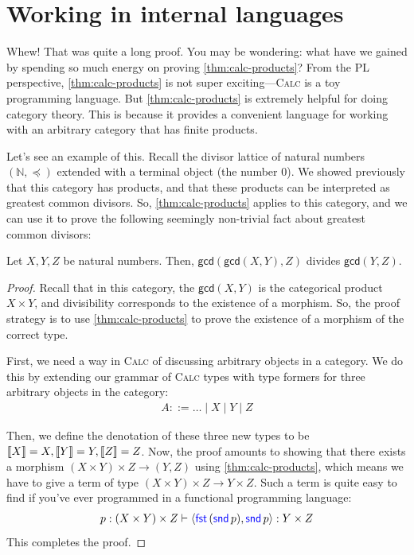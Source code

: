 \section{Working in internal languages}

Whew! That was quite a long proof.
You may be wondering: what have we gained by spending so much energy on proving
\cref{thm:calc-products}?
From the PL perspective, \cref{thm:calc-products} is not super exciting---\textsc{Calc}
is a toy programming language.
But \cref{thm:calc-products} is extremely helpful for doing category theory.
This is because it provides a convenient language for working with an arbitrary
category that has finite products. 

Let's see an example of this. Recall the divisor lattice of natural numbers
$(\mathbb{N}, \preceq)$ extended with a terminal object (the number $0$). We
showed previously that this category has products, and that these products 
can be interpreted as greatest common divisors. So, \cref{thm:calc-products} applies 
to this category, 
and we can use it to prove the following seemingly non-trivial fact about greatest common divisors:
\begin{proposition}
  Let $X, Y, Z$ be natural numbers. Then, $\mathsf{gcd}(\mathsf{gcd}(X, Y), Z)$
  divides $\mathsf{gcd}(Y, Z)$.
\end{proposition}
\begin{proof}
  Recall that in this category, the $\mathsf{gcd}(X, Y)$ is the categorical product $X \times Y$,
  and divisibility corresponds to the existence of a morphism.
  So, the proof strategy is to use \cref{thm:calc-products} to prove the existence of a morphism 
  of the correct type.

  First, we need a way in \textsc{Calc} of discussing arbitrary objects in a category. 
  We do this by extending our grammar of \textsc{Calc} types with type formers for three 
  arbitrary objects in the category:
  \begin{align*}
    A ::= \dots \mid X \mid Y \mid Z
  \end{align*}

  Then, we define the denotation of these three new types to be $\left\llbracket X \right\rrbracket = X, \left\llbracket Y \right\rrbracket = Y, 
  \left\llbracket Z \right\rrbracket = Z$.
  Now, the proof amounts to showing that there 
  exists a morphism $(X \times Y) \times Z \to (Y, Z)$ using \cref{thm:calc-products}, 
  which means we have to give a term of type $(X \times Y) \times Z \to Y \times Z$.
  Such a term is quite easy to find if you've ever programmed in a functional 
  programming language:
  \begin{align*}
    p : (X \times Y) \times Z \vdash \langle \mathsf{{\color{blue}fst}}\,(\mathsf{{\color{blue}snd}}\,p), \mathsf{{\color{blue}snd}}\,p \rangle : Y \times Z
  \end{align*}
  This completes the proof.
\end{proof}

